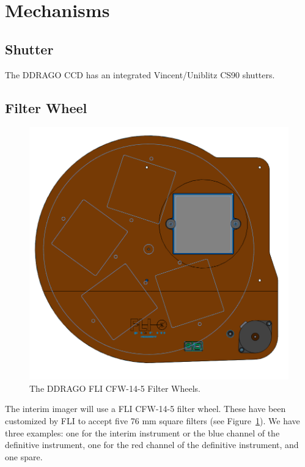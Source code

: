 \documentclass{article}
\begin{document}
\clearpage
\section{Mechanisms}

\subsection{Shutter}

The DDRAGO CCD has an integrated Vincent/Uniblitz CS90 shutters.

\subsection{Filter Wheel}

\begin{figure}[p]
\begin{center}
\includegraphics[width=\linewidth]{newfigures/Fig6_1.png}
\end{center}
\caption{The DDRAGO FLI CFW-14-5 Filter Wheels.}
\label{figure:alex-ddrago-cfw}
\end{figure}

The interim imager will use a FLI CFW-14-5 filter wheel. These have been customized by FLI to accept five 76 mm square filters (see Figure~\ref{figure:alex-ddrago-cfw}). We have three examples: one for the interim instrument or the blue channel of the definitive instrument, one for the red channel of the definitive instrument, and one spare.
\end{document}
